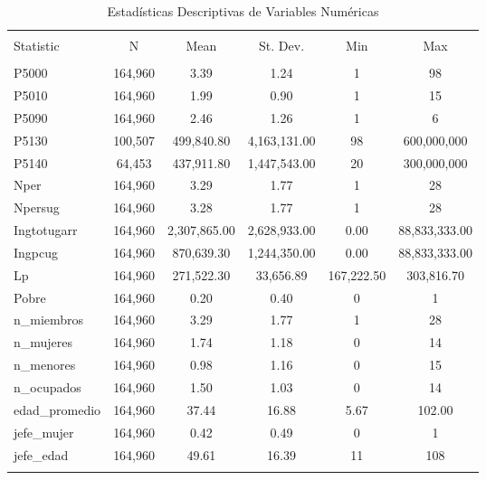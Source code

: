 
\begin{table}[!htbp] \centering 
  \caption{Estadísticas Descriptivas de Variables Numéricas} 
  \label{} 
\begin{tabular}{@{\extracolsep{5pt}}lccccc} 
\\[-1.8ex]\hline 
\hline \\[-1.8ex] 
Statistic & \multicolumn{1}{c}{N} & \multicolumn{1}{c}{Mean} & \multicolumn{1}{c}{St. Dev.} & \multicolumn{1}{c}{Min} & \multicolumn{1}{c}{Max} \\ 
\hline \\[-1.8ex] 
P5000 & 164,960 & 3.39 & 1.24 & 1 & 98 \\ 
P5010 & 164,960 & 1.99 & 0.90 & 1 & 15 \\ 
P5090 & 164,960 & 2.46 & 1.26 & 1 & 6 \\ 
P5130 & 100,507 & 499,840.80 & 4,163,131.00 & 98 & 600,000,000 \\ 
P5140 & 64,453 & 437,911.80 & 1,447,543.00 & 20 & 300,000,000 \\ 
Nper & 164,960 & 3.29 & 1.77 & 1 & 28 \\ 
Npersug & 164,960 & 3.28 & 1.77 & 1 & 28 \\ 
Ingtotugarr & 164,960 & 2,307,865.00 & 2,628,933.00 & 0.00 & 88,833,333.00 \\ 
Ingpcug & 164,960 & 870,639.30 & 1,244,350.00 & 0.00 & 88,833,333.00 \\ 
Lp & 164,960 & 271,522.30 & 33,656.89 & 167,222.50 & 303,816.70 \\ 
Pobre & 164,960 & 0.20 & 0.40 & 0 & 1 \\ 
n\_miembros & 164,960 & 3.29 & 1.77 & 1 & 28 \\ 
n\_mujeres & 164,960 & 1.74 & 1.18 & 0 & 14 \\ 
n\_menores & 164,960 & 0.98 & 1.16 & 0 & 15 \\ 
n\_ocupados & 164,960 & 1.50 & 1.03 & 0 & 14 \\ 
edad\_promedio & 164,960 & 37.44 & 16.88 & 5.67 & 102.00 \\ 
jefe\_mujer & 164,960 & 0.42 & 0.49 & 0 & 1 \\ 
jefe\_edad & 164,960 & 49.61 & 16.39 & 11 & 108 \\ 
\hline \\[-1.8ex] 
\end{tabular} 
\end{table} 
